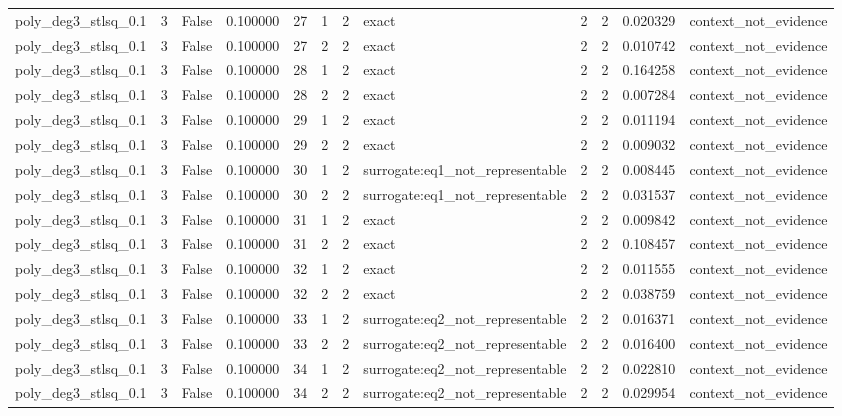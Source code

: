 \begin{tabular}{lrrrrrrlrrrl}
poly\_deg3\_stlsq\_0.1 & 3 & False & 0.100000 & 27 & 1 & 2 & exact & 2 & 2 & 0.020329 & context\_not\_evidence \\
poly\_deg3\_stlsq\_0.1 & 3 & False & 0.100000 & 27 & 2 & 2 & exact & 2 & 2 & 0.010742 & context\_not\_evidence \\
poly\_deg3\_stlsq\_0.1 & 3 & False & 0.100000 & 28 & 1 & 2 & exact & 2 & 2 & 0.164258 & context\_not\_evidence \\
poly\_deg3\_stlsq\_0.1 & 3 & False & 0.100000 & 28 & 2 & 2 & exact & 2 & 2 & 0.007284 & context\_not\_evidence \\
poly\_deg3\_stlsq\_0.1 & 3 & False & 0.100000 & 29 & 1 & 2 & exact & 2 & 2 & 0.011194 & context\_not\_evidence \\
poly\_deg3\_stlsq\_0.1 & 3 & False & 0.100000 & 29 & 2 & 2 & exact & 2 & 2 & 0.009032 & context\_not\_evidence \\
poly\_deg3\_stlsq\_0.1 & 3 & False & 0.100000 & 30 & 1 & 2 & surrogate:eq1\_not\_representable & 2 & 2 & 0.008445 & context\_not\_evidence \\
poly\_deg3\_stlsq\_0.1 & 3 & False & 0.100000 & 30 & 2 & 2 & surrogate:eq1\_not\_representable & 2 & 2 & 0.031537 & context\_not\_evidence \\
poly\_deg3\_stlsq\_0.1 & 3 & False & 0.100000 & 31 & 1 & 2 & exact & 2 & 2 & 0.009842 & context\_not\_evidence \\
poly\_deg3\_stlsq\_0.1 & 3 & False & 0.100000 & 31 & 2 & 2 & exact & 2 & 2 & 0.108457 & context\_not\_evidence \\
poly\_deg3\_stlsq\_0.1 & 3 & False & 0.100000 & 32 & 1 & 2 & exact & 2 & 2 & 0.011555 & context\_not\_evidence \\
poly\_deg3\_stlsq\_0.1 & 3 & False & 0.100000 & 32 & 2 & 2 & exact & 2 & 2 & 0.038759 & context\_not\_evidence \\
poly\_deg3\_stlsq\_0.1 & 3 & False & 0.100000 & 33 & 1 & 2 & surrogate:eq2\_not\_representable & 2 & 2 & 0.016371 & context\_not\_evidence \\
poly\_deg3\_stlsq\_0.1 & 3 & False & 0.100000 & 33 & 2 & 2 & surrogate:eq2\_not\_representable & 2 & 2 & 0.016400 & context\_not\_evidence \\
poly\_deg3\_stlsq\_0.1 & 3 & False & 0.100000 & 34 & 1 & 2 & surrogate:eq2\_not\_representable & 2 & 2 & 0.022810 & context\_not\_evidence \\
poly\_deg3\_stlsq\_0.1 & 3 & False & 0.100000 & 34 & 2 & 2 & surrogate:eq2\_not\_representable & 2 & 2 & 0.029954 & context\_not\_evidence \\

\end{tabular}
